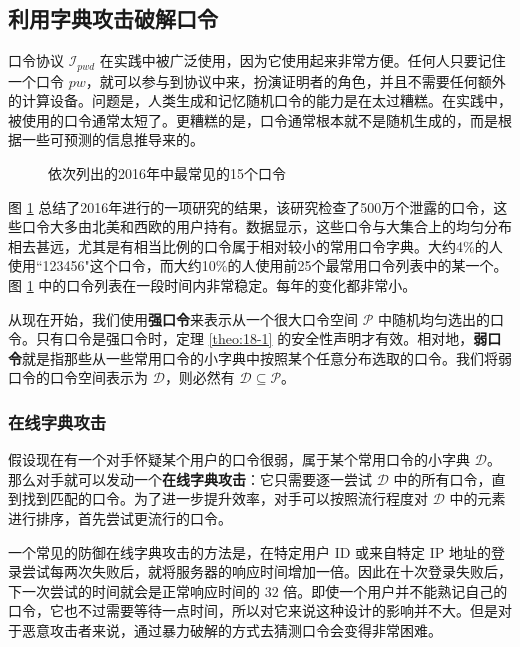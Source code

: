 \subsection{利用字典攻击破解口令}

口令协议 $\mathcal{I}_{pwd}$ 在实践中被广泛使用，因为它使用起来非常方便。任何人只要记住一个口令 $pw$，就可以参与到协议中来，扮演证明者的角色，并且不需要任何额外的计算设备。问题是，人类生成和记忆随机口令的能力是在太过糟糕。在实践中，被使用的口令通常太短了。更糟糕的是，口令通常根本就不是随机生成的，而是根据一些可预测的信息推导来的。

\begin{figure}
    \centering
    
    \caption{依次列出的2016年中最常见的15个口令}
    \label{fig:18-3}
\end{figure}

图 \ref{fig:18-3} 总结了2016年进行的一项研究的结果，该研究检查了500万个泄露的口令，这些口令大多由北美和西欧的用户持有。数据显示，这些口令与大集合上的均匀分布相去甚远，尤其是有相当比例的口令属于相对较小的常用口令字典。大约4\%的人使用``123456"这个口令，而大约10\%的人使用前25个最常用口令列表中的某一个。图 \ref{fig:18-3} 中的口令列表在一段时间内非常稳定。每年的变化都非常小。

从现在开始，我们使用\textbf{强口令}来表示从一个很大口令空间 $\mathcal{P}$ 中随机均匀选出的口令。只有口令是强口令时，定理 \ref{theo:18-1} 的安全性声明才有效。相对地，\textbf{弱口令}就是指那些从一些常用口令的小字典中按照某个任意分布选取的口令。我们将弱口令的口令空间表示为 $\mathcal{D}$，则必然有 $\mathcal{D}\subseteq\mathcal{P}$。

\subsubsection{在线字典攻击}

假设现在有一个对手怀疑某个用户的口令很弱，属于某个常用口令的小字典 $\mathcal{D}$。那么对手就可以发动一个\textbf{在线字典攻击}：它只需要逐一尝试 $\mathcal{D}$ 中的所有口令，直到找到匹配的口令。为了进一步提升效率，对手可以按照流行程度对 $\mathcal{D}$ 中的元素进行排序，首先尝试更流行的口令。

一个常见的防御在线字典攻击的方法是，在特定用户 ID 或来自特定 IP 地址的登录尝试每两次失败后，就将服务器的响应时间增加一倍。因此在十次登录失败后，下一次尝试的时间就会是正常响应时间的 $32$ 倍。即使一个用户并不能熟记自己的口令，它也不过需要等待一点时间，所以对它来说这种设计的影响并不大。但是对于恶意攻击者来说，通过暴力破解的方式去猜测口令会变得非常困难。

